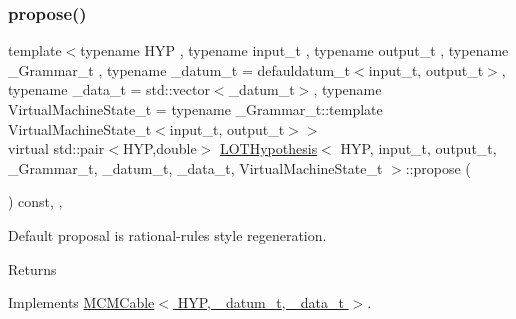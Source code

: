 \mbox{\label{class_l_o_t_hypothesis_a9a03abc8a6d96995c0f13524f8500747}} 
\subsubsection{\texorpdfstring{propose()}{propose()}}
{\footnotesize\ttfamily template$<$typename H\+YP , typename input\+\_\+t , typename output\+\_\+t , typename \+\_\+\+Grammar\+\_\+t , typename \+\_\+datum\+\_\+t  = defauldatum\+\_\+t$<$input\+\_\+t, output\+\_\+t$>$, typename \+\_\+data\+\_\+t  = std\+::vector$<$\+\_\+datum\+\_\+t$>$, typename Virtual\+Machine\+State\+\_\+t  = typename \+\_\+\+Grammar\+\_\+t\+::template Virtual\+Machine\+State\+\_\+t$<$input\+\_\+t, output\+\_\+t$>$$>$ \\
virtual std\+::pair$<$H\+YP,double$>$ \hyperlink{class_l_o_t_hypothesis}{L\+O\+T\+Hypothesis}$<$ H\+YP, input\+\_\+t, output\+\_\+t, \+\_\+\+Grammar\+\_\+t, \+\_\+datum\+\_\+t, \+\_\+data\+\_\+t, Virtual\+Machine\+State\+\_\+t $>$\+::propose (\begin{DoxyParamCaption}{ }\end{DoxyParamCaption}) const\hspace{0.3cm}{\ttfamily [inline]}, {\ttfamily [override]}, {\ttfamily [virtual]}}

Default proposal is rational-\/rules style regeneration. \begin{DoxyReturn}{Returns}

\end{DoxyReturn}


Implements \hyperlink{class_m_c_m_cable_ab119a14256ab92c5c1e941f8492df830}{M\+C\+M\+Cable$<$ H\+Y\+P, \+\_\+datum\+\_\+t, \+\_\+data\+\_\+t $>$}.

\mbox{\label{class_l_o_t_hypothesis_a2b9a0eca1e2124f92bd34d8da929fe71}} 
